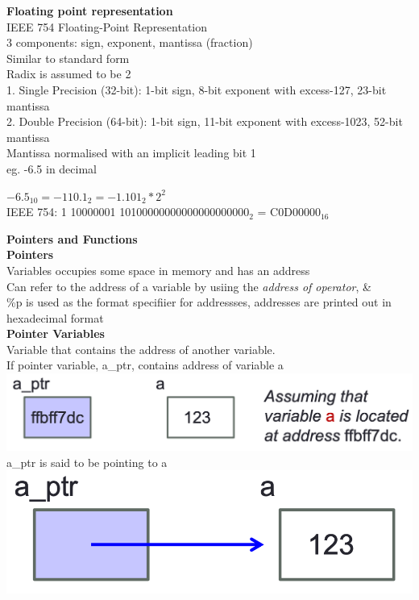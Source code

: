 \documentclass[10pt, a4paper]{article}
\begin{document}
\begin{multicols*}{3}
		\textbf{Floating point representation}\\
		IEEE 754 Floating-Point Representation\\
		3 components: sign, exponent, mantissa (fraction)\\
		Similar to standard form\\
		Radix is assumed to be 2\\
		1. Single Precision (32-bit): 1-bit sign, 8-bit exponent with excess-127, 23-bit mantissa\\
		2. Double Precision (64-bit): 1-bit sign, 11-bit exponent with excess-1023, 52-bit mantissa\\
		Mantissa normalised with an implicit leading bit 1\\
		eg. -6.5 in decimal
		\begin{center}
			$-6.5_{10} = -110.1_2 = -1.101_2 * 2^2$\\
			IEEE 754: 1 10000001 10100000000000000000000$_2$ = C0D00000$_{16}$\\
		\end{center}
		
		{\normalsize\textbf{Pointers and Functions}}\\
		\textbf{Pointers}\\
		Variables occupies some space in memory and has an address\\
		Can refer to the address of a variable by usiing the \textit{address of operator}, \&\\
		\%p is used as the format specifiier for addressses, addresses are printed out in hexadecimal format\\
		
		\textbf{Pointer Variables}\\
		Variable that contains the address of another variable.\\
		If pointer variable, a\_ptr, contains address of variable a\\
		\includegraphics[scale=0.25]{./assets/pointer1}\\
		a\_ptr is said to be pointing to a\\
		\includegraphics[scale=0.25]{./assets/pointer2}\\
		

\end{multicols*}
\end{document}
